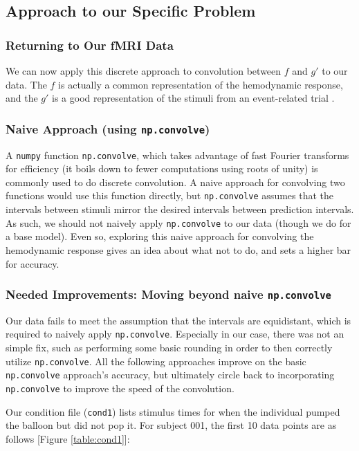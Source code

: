 \subsection{Approach to our Specific Problem}

\subsubsection{Returning to Our fMRI Data}

We can now apply this discrete approach to convolution between $f$ and $g'$ 
to our data. The $f$ is actually a common representation of the hemodynamic 
response, and the $g'$ is a good representation of the stimuli from an 
event-related trial \cite{brett2015course}. 

\subsubsection{Naive Approach (using \texttt{np.convolve})}

A \texttt{numpy} function \texttt{np.convolve}, which takes advantage of 
fast Fourier transforms for efficiency (it boils down to fewer computations 
using roots of unity) is commonly used to do discrete convolution. A naive 
approach for convolving two functions would use this function directly, but
\texttt{np.convolve} assumes that the intervals between stimuli mirror the 
desired intervals between prediction intervals. As such, we should not naively 
apply \texttt{np.convolve} to our data (though we do for a base model). 
Even so, exploring this naive approach for convolving the hemodynamic response 
gives an idea about what not to do, and sets a higher bar for accuracy.

\subsubsection{Needed Improvements: Moving beyond naive \texttt{np.convolve}}

Our data fails to meet the assumption that the intervals are equidistant, 
which is required to naively apply \texttt{np.convolve}. Especially in our 
case, there was not an simple fix, such as performing some basic rounding in 
order to then correctly utilize \texttt{np.convolve}. All the following 
approaches improve on the basic \texttt{np.convolve} approach's accuracy, but 
ultimately circle back to incorporating \texttt{np.convolve} to improve the 
speed of the convolution.

Our condition file (\texttt{cond1}) lists stimulus times for when the 
individual pumped the balloon but did not pop it. For subject 001, the 
first 10 data points are as follows [Figure \ref{table:cond1}]:

